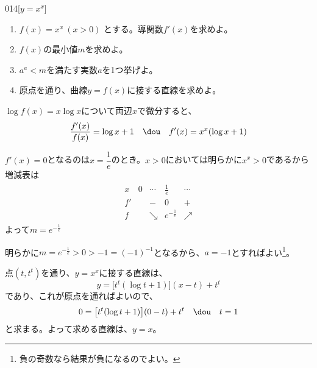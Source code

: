\begin{thm}{014}{}{[$y=x^x$]}
 \begin{enumerate}
  \item $f(x)=x^x~(x>0)$ とする。導関数$f'(x)$を求めよ。
  \item $f(x)$の最小値$m$を求めよ。
  \item $a^a < m$を満たす実数$a$を1つ挙げよ。
  \item 原点を通り、曲線$y=f(x)$に接する直線を求めよ。
 \end{enumerate}
\end{thm}

$\log f(x)=x\log x$について両辺$x$で微分すると、
\[ \frac{f'(x)}{f(x)}=\log x+1 \quad\dou\quad f'(x)=x^x(\log x+1) \]

$f'(x)=0$となるのは$x=\dfrac{1}{e}$のとき。$x>0$においては明らかに$x^x>0$であるから増減表は
\begin{align*}
\begin{array}{c|c|c|c|c}
 x & 0 & \cdots & \frac{1}{e} & \cdots \\ \hline\hline
 f' & & - & 0 & + \\ \hline
 f & & \searrow & e^{-\frac{1}{e}} & \nearrow
\end{array}
\end{align*}
よって$m=e^{-\frac{1}{e}}$

明らかに$m=e^{-\frac{1}{e}}>0>-1=(-1)^{-1}$となるから、$a=-1$とすればよい\footnote{負の奇数なら結果が負になるのでよい。}。

点$(t,t^t)$を通り、$y=x^x$に接する直線は、
\[ y=\bigl[t^t(\log t+1)\bigr](x-t)+t^t \]
であり、これが原点を通ればよいので、
\[ 0=\bigl[t^t(\log t+1)\bigr](0-t)+t^t \quad\dou\quad t=1 \]
と求まる。よって求める直線は、$y=x$。